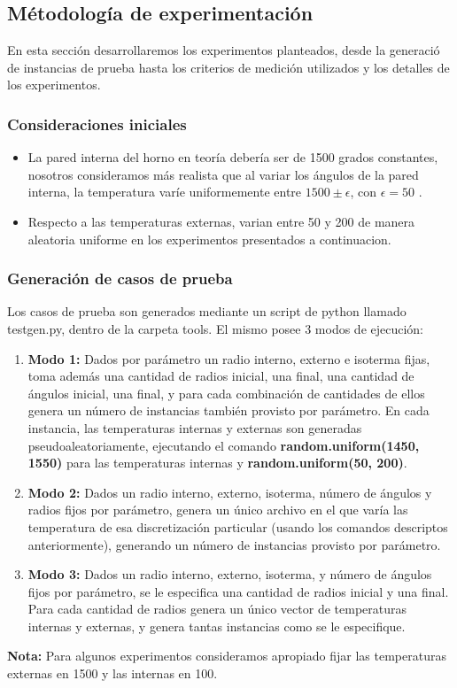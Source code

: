 \subsection{Métodología de experimentación}
En esta sección desarrollaremos los experimentos planteados, desde la generació de instancias de prueba hasta los criterios de medición utilizados y los detalles de los experimentos.
\subsubsection{Consideraciones iniciales}
\begin{itemize}
    \item La pared interna del horno en teoría debería ser de 1500 grados constantes, nosotros consideramos más realista que al variar los ángulos de la pared interna, la temperatura varíe uniformemente entre $1500 \pm \epsilon$, con $\epsilon = 50$ .

    \item Respecto a las temperaturas externas, varian entre 50 y 200 de manera aleatoria uniforme en los experimentos presentados a continuacion.
\end{itemize}

\subsubsection{Generación de casos de prueba}
Los casos de prueba son generados mediante un script de python llamado testgen.py, dentro de la carpeta tools. El mismo posee 3 modos de ejecuci\'on: 
\begin{enumerate}
    \item \textbf{Modo 1:} Dados por par\'ametro un radio interno, externo e isoterma fijas, toma adem\'as  una cantidad de radios inicial, una final, una cantidad de \'angulos inicial, una final, y para cada combinaci\'on de cantidades de ellos genera un n\'umero de instancias tambi\'en provisto por par\'ametro. En cada instancia, las temperaturas internas y externas son generadas pseudoaleatoriamente, ejecutando el comando \textbf{random.uniform(1450, 1550)} para las temperaturas internas y \textbf{random.uniform(50, 200)}.
    \item \textbf{Modo 2:} Dados un radio interno, externo, isoterma, n\'umero de \'angulos y radios fijos por par\'ametro, genera un \'unico archivo en el que var\'ia las temperatura de esa discretizaci\'on particular (usando los comandos descriptos anteriormente), generando un n\'umero de instancias provisto por par\'ametro.
    \item \textbf{Modo 3:} Dados un radio interno, externo, isoterma, y n\'umero de ángulos fijos por par\'ametro, se le especifica una cantidad de radios inicial y una final.  Para cada cantidad de radios genera un \'unico vector de temperaturas internas y externas, y genera tantas instancias como se le especifique.

\end{enumerate}
\textbf{Nota: } Para algunos experimentos consideramos apropiado fijar las temperaturas externas en 1500 y las internas en 100.

